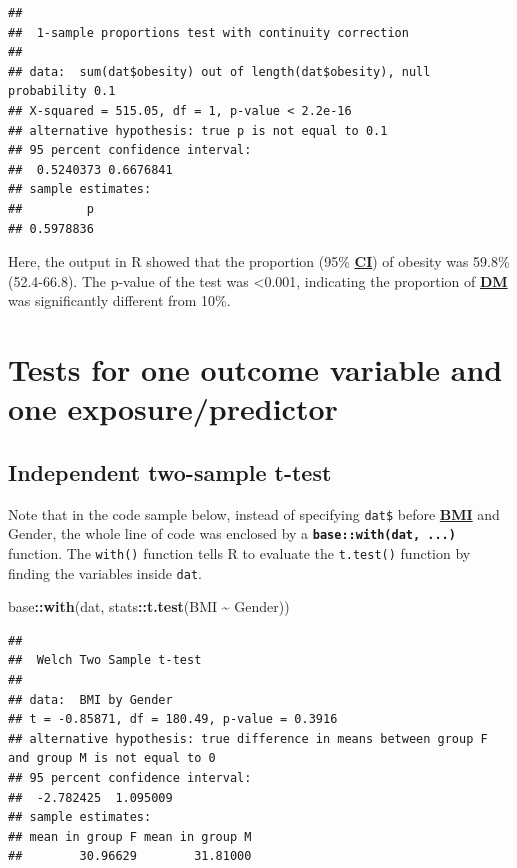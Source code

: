 \documentclass[
]{book}
\newenvironment{Shaded}{\begin{snugshade}}{\end{snugshade}}
\newcommand{\FunctionTok}[1]{\textcolor[rgb]{0.13,0.29,0.53}{\textbf{#1}}}
\newcommand{\NormalTok}[1]{#1}
\newcommand{\SpecialCharTok}[1]{\textcolor[rgb]{0.81,0.36,0.00}{\textbf{#1}}}
\begin{document}
\begin{verbatim}
## 
##  1-sample proportions test with continuity correction
## 
## data:  sum(dat$obesity) out of length(dat$obesity), null probability 0.1
## X-squared = 515.05, df = 1, p-value < 2.2e-16
## alternative hypothesis: true p is not equal to 0.1
## 95 percent confidence interval:
##  0.5240373 0.6676841
## sample estimates:
##         p 
## 0.5978836
\end{verbatim}

Here, the output in R showed that the proportion (95\% \textbf{\hyperref[acronyms_CI]{CI}}) of obesity was 59.8\% (52.4-66.8). The p-value of the test was \textless0.001, indicating the proportion of \textbf{\hyperref[acronyms_DM]{DM}} was significantly different from 10\%.

\section{Tests for one outcome variable and one exposure/predictor}\label{tests-for-one-outcome-variable-and-one-exposurepredictor}

\subsection{Independent two-sample t-test}\label{independent-two-sample-t-test}

Note that in the code sample below, instead of specifying \texttt{dat\$} before \textbf{\hyperref[acronyms_BMI]{BMI}} and Gender, the whole line of code was enclosed by a \textbf{\texttt{base::with(dat,\ ...)}} function. The \texttt{with()} function tells R to evaluate the \texttt{t.test()} function by finding the variables inside \texttt{dat}.

\begin{Shaded}
\begin{Highlighting}[]
\NormalTok{base}\SpecialCharTok{::}\FunctionTok{with}\NormalTok{(dat, stats}\SpecialCharTok{::}\FunctionTok{t.test}\NormalTok{(BMI }\SpecialCharTok{\textasciitilde{}}\NormalTok{ Gender))}
\end{Highlighting}
\end{Shaded}

\begin{verbatim}
## 
##  Welch Two Sample t-test
## 
## data:  BMI by Gender
## t = -0.85871, df = 180.49, p-value = 0.3916
## alternative hypothesis: true difference in means between group F and group M is not equal to 0
## 95 percent confidence interval:
##  -2.782425  1.095009
## sample estimates:
## mean in group F mean in group M 
##        30.96629        31.81000
\end{verbatim}
\end{document}
